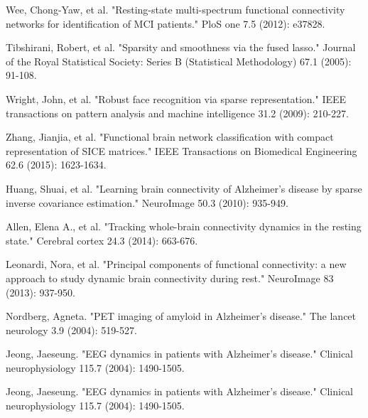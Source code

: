 \documentclass[journal]{IEEEtran}
\begin{document}
\begin{thebibliography}{1}
		Wee, Chong-Yaw, et al. "Resting-state multi-spectrum functional connectivity networks for identification of MCI patients." PloS one 7.5 (2012): e37828.
		
		Tibshirani, Robert, et al. "Sparsity and smoothness via the fused lasso." Journal of the Royal Statistical Society: Series B (Statistical Methodology) 67.1 (2005): 91-108.
		
		Wright, John, et al. "Robust face recognition via sparse representation." IEEE transactions on pattern analysis and machine intelligence 31.2 (2009): 210-227.
		
		Zhang, Jianjia, et al. "Functional brain network classification with compact representation of SICE matrices." IEEE Transactions on Biomedical Engineering 62.6 (2015): 1623-1634.
		
		Huang, Shuai, et al. "Learning brain connectivity of Alzheimer's disease by sparse inverse covariance estimation." NeuroImage 50.3 (2010): 935-949.
		
		Allen, Elena A., et al. "Tracking whole-brain connectivity dynamics in the resting state." Cerebral cortex 24.3 (2014): 663-676.
		
		
		
		Leonardi, Nora, et al. "Principal components of functional connectivity: a new approach to study dynamic brain connectivity during rest." NeuroImage 83 (2013): 937-950.
		
		
		Nordberg, Agneta. "PET imaging of amyloid in Alzheimer's disease." The lancet neurology 3.9 (2004): 519-527.
		
		Jeong, Jaeseung. "EEG dynamics in patients with Alzheimer's disease." Clinical neurophysiology 115.7 (2004): 1490-1505.
		
		Jeong, Jaeseung. "EEG dynamics in patients with Alzheimer's disease." Clinical neurophysiology 115.7 (2004): 1490-1505.
		

\end{thebibliography}
\end{document}
